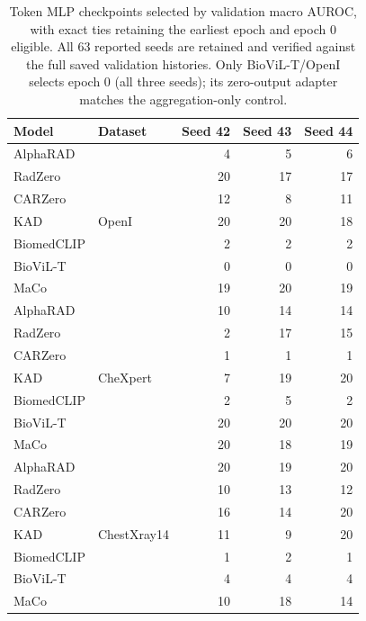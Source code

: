 \begin{table}[t]
\centering
\footnotesize
\setlength{\tabcolsep}{4pt}
\begin{tabular}{@{}llrrr@{}}
\toprule
Model & Dataset & Seed 42 & Seed 43 & Seed 44 \\
\midrule
AlphaRAD & \multirow{7}{*}{OpenI} & 4 & 5 & 6 \\
RadZero &  & 20 & 17 & 17 \\
CARZero &  & 12 & 8 & 11 \\
KAD &  & 20 & 20 & 18 \\
BiomedCLIP &  & 2 & 2 & 2 \\
BioViL-T &  & 0 & 0 & 0 \\
MaCo &  & 19 & 20 & 19 \\
\midrule
AlphaRAD & \multirow{7}{*}{CheXpert} & 10 & 14 & 14 \\
RadZero &  & 2 & 17 & 15 \\
CARZero &  & 1 & 1 & 1 \\
KAD &  & 7 & 19 & 20 \\
BiomedCLIP &  & 2 & 5 & 2 \\
BioViL-T &  & 20 & 20 & 20 \\
MaCo &  & 20 & 18 & 19 \\
\midrule
AlphaRAD & \multirow{7}{*}{ChestXray14} & 20 & 19 & 20 \\
RadZero &  & 10 & 13 & 12 \\
CARZero &  & 16 & 14 & 20 \\
KAD &  & 11 & 9 & 20 \\
BiomedCLIP &  & 1 & 2 & 1 \\
BioViL-T &  & 4 & 4 & 4 \\
MaCo &  & 10 & 18 & 14 \\
\bottomrule
\end{tabular}
\caption{Token MLP checkpoints selected by validation macro AUROC, with exact ties retaining the earliest epoch and epoch 0 eligible. All 63 reported seeds are retained and verified against the full saved validation histories. Only BioViL-T/OpenI selects epoch 0 (all three seeds); its zero-output adapter matches the aggregation-only control.}
\label{tab:token_mlp_selected_epochs}
\end{table}

